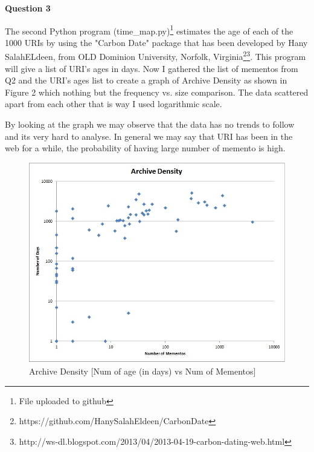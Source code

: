 \documentclass[a4paper,12pt]{article}
\begin{document}
\pagebreak
\textbf{Question 3}\par
The second Python program (time\_map.py)\footnote{File uploaded to github} estimates the age of each of the 1000 URIs by using the "Carbon Date" package that has been  developed by Hany SalahELdeen, from OLD Dominion University, Norfolk, Virginia\footnote{https://github.com/HanySalahEldeen/CarbonDate}\footnote{http://ws-dl.blogspot.com/2013/04/2013-04-19-carbon-dating-web.html}. This program will give a list of URI's ages in days. Now I gathered the list of mementos from Q2 and the URI's ages list to create a graph of Archive Density as shown in Figure 2 which nothing but the frequency vs. size comparison. The data scattered apart from each other that is way I used logarithmic scale.\par
By looking at the graph we may observe that the data has no trends to follow and its very hard to analyse. In general we may say that URI has been in the web for a while, the probability of having large number of memento is high.   
\linebreak
  
\pagebreak
\begin{figure}
\center
\includegraphics[width=\linewidth]{fig2.jpg} 
\caption{Archive Density [Num of age (in days) vs Num of Mementos]}
\end{figure}
\end{document}
